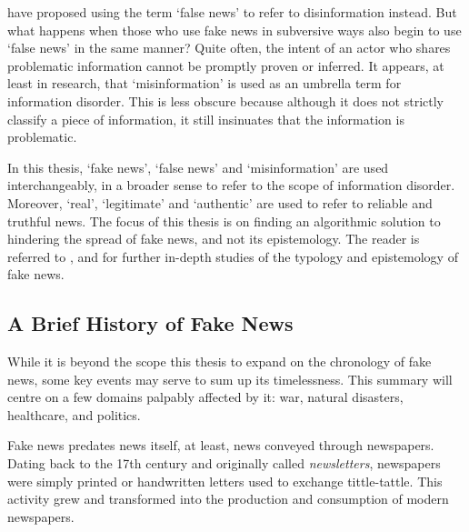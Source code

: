  have proposed using the term `false news' to refer to disinformation instead. But what happens when those who use fake news in subversive ways also begin to use `false news' in the same manner? Quite often, the intent of an actor who shares problematic information cannot be promptly proven or inferred. It appears, at least in research, that `misinformation' is used as an umbrella term for information disorder. This is less obscure because although it does not strictly classify a piece of information, it still insinuates that the information is problematic.

In this thesis, `fake news', `false news' and `misinformation' are used interchangeably, in a broader sense to refer to the scope of information disorder. Moreover, `real', `legitimate' and `authentic' are used to refer to reliable and truthful news. The focus of this thesis is on finding an algorithmic solution to hindering the spread of fake news, and not its epistemology. The reader is referred to ,  and  for further in-depth studies of the typology and epistemology of fake news.

\subsection{A Brief History of Fake News}
\label{ssec:1-history}
While it is beyond the scope this thesis to expand on the chronology of fake news, some key events may serve to sum up its timelessness. This summary will centre on a few domains palpably affected by it: war, natural disasters, healthcare, and politics.

Fake news predates news itself, at least, news conveyed through newspapers. Dating back to the 17th century and originally called \emph{newsletters}, newspapers were simply printed or handwritten letters used to exchange tittle-tattle. This activity grew and transformed into the production and consumption of modern newspapers.

